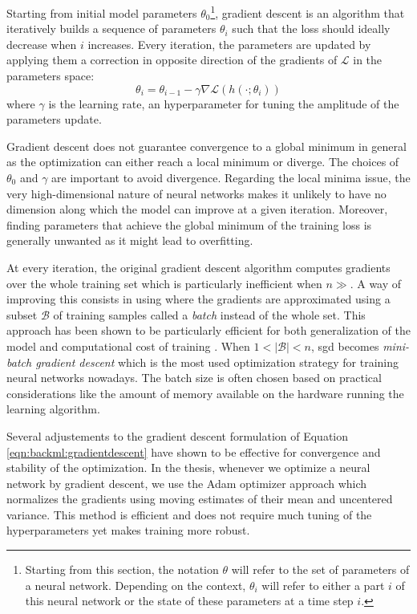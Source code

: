 Starting from initial model parameters $\theta_0$\footnote{Starting from this section, 
the notation $\theta$ will refer to the set of parameters of a neural network. Depending 
on the context, $\theta_i$ will refer to either a part $i$ of this neural network or the state 
of these parameters at a time step $i$.}, gradient descent is an algorithm
that iteratively builds a sequence of parameters $\theta_i$ such that the loss
should ideally decrease when $i$ increases. Every iteration, the parameters are
updated by applying them a correction in opposite direction of the gradients of
$\mathcal{L}$ in the parameters space:
\begin{equation}
\label{eqn:backml:gradientdescent}
\theta_{i} = \theta_{i-1} - \gamma \nabla \mathcal{L}(h(\cdot; \theta_{i}))
\end{equation}
where $\gamma$ is the learning rate, an hyperparameter for tuning the amplitude
of the parameters update.

Gradient descent does not guarantee convergence to a global minimum in general as
the optimization can either reach a local minimum or diverge. The choices of
$\theta_0$ and $\gamma$ are important to avoid divergence. Regarding the local
minima issue, the very high-dimensional nature of neural networks makes it unlikely
to have no dimension along which the model can improve at a given iteration.
Moreover, finding parameters that achieve the global minimum of the training loss
is generally unwanted as it might lead to overfitting.

At every iteration, the original gradient descent algorithm computes gradients
over the whole training set which is particularly inefficient when $n \gg$. A
way of improving this consists in using  where the gradients are
approximated using a subset $\mathcal{B}$ of training samples called a \textit{batch}
instead of the whole set. This approach has been shown to be particularly efficient
for both generalization of the model and computational cost of training
\cite{bottou201113}. When $1 < |\mathcal{B}| < n$, \acrshort{sgd} becomes
\textit{mini-batch gradient descent} which is the most used optimization strategy
for training neural networks nowadays. The batch size is often chosen based on
practical considerations like the amount of memory available on the hardware
running the learning algorithm.

Several adjustements to the gradient descent formulation of Equation
\ref{eqn:backml:gradientdescent} have shown to be effective for convergence and
stability of the optimization. In the thesis, whenever we optimize a neural network
by gradient descent, we use the Adam optimizer \cite{kingma2014adam} approach
which normalizes the gradients using moving estimates of their mean and uncentered
variance. This method is efficient and does not require much tuning of the
hyperparameters yet makes training more robust.

